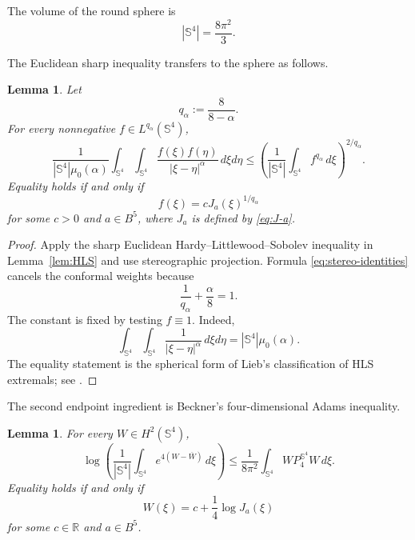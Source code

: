 \documentclass[11pt]{article}
\newtheorem{lemma}[theorem]{Lemma}
\numberwithin{equation}{section}
\begin{document}
The volume of the round sphere is
\begin{equation}\label{eq:sphere-volume}
|\mathbb S^{4}|=\frac{8\pi^{2}}{3}.
\end{equation}

The Euclidean sharp inequality transfers to the sphere as follows.

\begin{lemma}\label{lem:spherical-HLS}
Let
\begin{equation}\label{eq:q-alpha}
q_{\alpha}:=\frac{8}{8-\alpha}.
\end{equation}
For every nonnegative \(f\in L^{q_{\alpha}}(\mathbb S^{4})\),
\begin{equation*}
\frac{1}{|\mathbb S^{4}|\mu_{0}(\alpha)}
\int_{\mathbb S^{4}}\int_{\mathbb S^{4}}
\frac{f(\xi)f(\eta)}{|\xi-\eta|^{\alpha}}\,d\xi d\eta
\leq
\left(\frac{1}{|\mathbb S^{4}|}
\int_{\mathbb S^{4}}f^{q_{\alpha}}\,d\xi\right)^{2/q_{\alpha}}.
\end{equation*}
Equality holds if and only if
\begin{equation*}
f(\xi)=cJ_{a}(\xi)^{1/q_{\alpha}}
\end{equation*}
for some \(c>0\) and \(a\in B^{5}\), where \(J_{a}\) is defined by \eqref{eq:J-a}.
\end{lemma}

\begin{proof}
Apply the sharp Euclidean Hardy--Littlewood--Sobolev inequality in Lemma~\ref{lem:HLS} and use stereographic projection. Formula \eqref{eq:stereo-identities} cancels the conformal weights because
\begin{equation}\label{eq:HLS-weight-cancellation}
\frac{1}{q_{\alpha}}+\frac{\alpha}{8}=1.
\end{equation}
The constant is fixed by testing \(f\equiv1\). Indeed,
\begin{equation*}
\int_{\mathbb S^{4}}\int_{\mathbb S^{4}}
\frac{1}{|\xi-\eta|^{\alpha}}\,d\xi d\eta
=|\mathbb S^{4}|\mu_{0}(\alpha).
\end{equation*}
The equality statement is the spherical form of Lieb's classification of HLS extremals; see \cite{FrankLieb,LiebSharp}.
\end{proof}

The second endpoint ingredient is Beckner's four-dimensional Adams inequality.

\begin{lemma}\label{lem:Beckner-Adams}
For every \(W\in H^{2}(\mathbb S^{4})\),
\begin{equation}\label{eq:Beckner-Adams}
\log\left(\frac{1}{|\mathbb S^{4}|}
\int_{\mathbb S^{4}}e^{4(W-\overline W)}\,d\xi\right)
\leq\frac{1}{8\pi^{2}}
\int_{\mathbb S^{4}}W P_{4}^{\mathbb S^{4}}W\,d\xi.
\end{equation}
Equality holds if and only if
\begin{equation}\label{eq:Beckner-Adams-equality}
W(\xi)=c+\frac14\log J_{a}(\xi)
\end{equation}
for some \(c\in\mathbb R\) and \(a\in B^{5}\).
\end{lemma}
\end{document}
